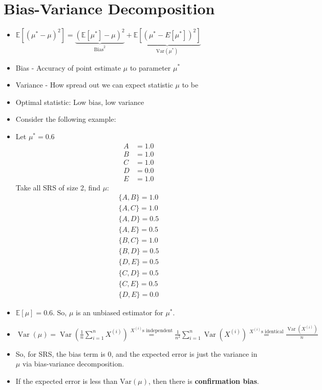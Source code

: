 \documentclass{article}
\begin{document}
\section{Bias-Variance Decomposition}
\begin{itemize}
    \item $\mathbb{E}[(\mu^* - \mu)^2] = \underbrace{(\mathbb{E}[\mu^*] - \mu)^2}_{\text{Bias}^2} + \underbrace{\mathbb{E}[(\mu^* - E[\mu^*])^2]}_{\text{Var}(\mu^*)}$
    \item Bias - Accuracy of point estimate $\mu$ to parameter $\mu^*$
    \item Variance - How spread out we can expect statistic $\mu$ to be
    \item Optimal statistic: Low bias, low variance
    \item Consider the following example:
    \item Let $\mu^* = 0.6$
    \begin{align*}
        A &= 1.0 \\
        B &= 1.0 \\
        C &= 1.0 \\
        D &= 0.0 \\
        E &= 1.0
    \end{align*}
    Take all SRS of size 2, find $\mu$:
    \begin{align*}
        \{A, B\} = 1.0 \\
        \{A, C\} = 1.0 \\
        \{A, D\} = 0.5 \\
        \{A, E\} = 0.5 \\
        \{B, C\} = 1.0 \\
        \{B, D\} = 0.5 \\
        \{D, E\} = 0.5 \\
        \{C, D\} = 0.5 \\
        \{C, E\} = 0.5 \\
        \{D, E\} = 0.0
    \end{align*}
    \item $\mathbb{E}[\mu] = 0.6$. So, $\mu$ is an unbiased estimator for $\mu^*$.
    \item $\operatorname{Var}(\mu)=\operatorname{Var}\!\left(\frac{1}{n}\sum_{i=1}^{n}X^{(i)}\right)\overset{X^{(i)}\text{s independent}}{=}\frac{1}{n^2}\sum_{i=1}^{n}\operatorname{Var}(X^{(i)})\overset{X^{(i)}\text{s identical}}{=}\frac{\operatorname{Var}(X^{(i)})}{n}$
    \item So, for SRS, the bias term is 0, and the expected error is just the variance in $\mu$ via bias-variance decomposition.
    \item If the expected error is less than $\text{Var}(\mu)$, then there is \textbf{confirmation bias}.
\end{itemize}
\end{document}
